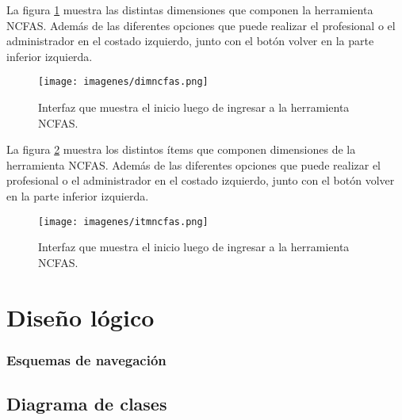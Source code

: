\clearpage
\newpage

La figura \ref{dimncfas} muestra las distintas dimensiones que componen la herramienta NCFAS. 
Además de las diferentes opciones que puede realizar el profesional o el administrador en el costado izquierdo, junto con el botón volver en la parte inferior izquierda.\\

\begin{figure}[htb]
	\label{dimncfas}
	\begin{center}
		\texttt{[image: imagenes/dimncfas.png]}
	\end{center}
	\caption{Interfaz que muestra el inicio luego de ingresar a la herramienta NCFAS.}
\end{figure}

\clearpage
\newpage

La figura \ref{itmncfas2} muestra los distintos ítems que componen dimensiones de la herramienta NCFAS. 
Además de las diferentes opciones que puede realizar el profesional o el administrador en el costado izquierdo, junto con el botón volver en la parte inferior izquierda.\\

\begin{figure}[htb]
	\label{itmncfas2}
	\begin{center}
		\texttt{[image: imagenes/itmncfas.png]}
	\end{center}
	\caption{Interfaz que muestra el inicio luego de ingresar a la herramienta NCFAS.}
\end{figure}

\clearpage
\newpage

\section{Diseño lógico} \label{disenolog}



\subsubsection{Esquemas de navegación}

\clearpage
\newpage

\subsection{Diagrama de clases}

\clearpage
\newpage

